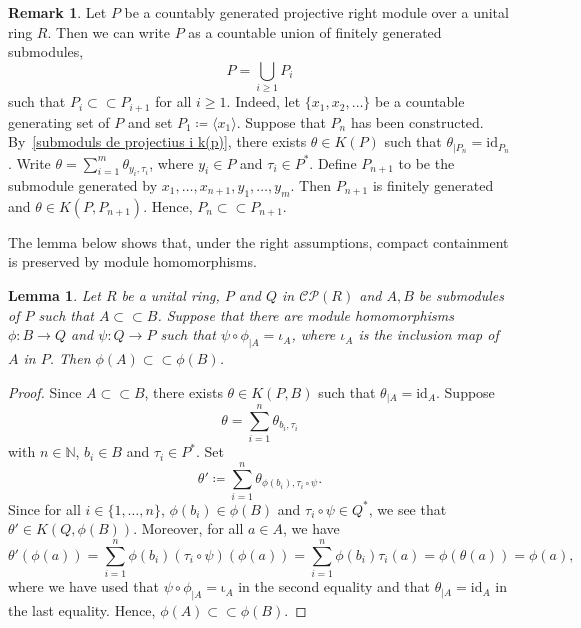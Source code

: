 \documentclass[11pt]{amsart}
\numberwithin{equation}{section}
\newtheorem{lma}{Lemma}[section]
\theoremstyle{definition}
\newtheorem{rmk}[rmkCt]{Remark}
\newcommand{\cc}{\subset\!\subset}
\theoremstyle{plain}
\theoremstyle{definition}
\begin{document}
\begin{rmk} \label{torre d'un projectiu en f.g. compactament continguts}
Let $P$ be a countably generated projective right module over a unital ring $R$. Then we can write $P$ as a countable union of finitely generated submodules, $$P = \bigcup_{i \geq 1} P_i$$ such that $P_i \subset\!\subset P_{i+1}$ for all $i \geq 1$. Indeed, let $\{ x_1, x_2, \dots\}$ be a countable generating set of $P$ and set $P_1 \coloneqq \langle x_1 \rangle$. Suppose that $P_n$ has been constructed. By~\autoref{submoduls de projectius i k(p)}, there exists $\theta \in K(P)$ such that $\theta_{|P_n} = \mathrm{id}_{P_n}$. Write $\theta = \sum_{i = 1}^m \theta_{y_i, \tau_i}$, where $y_i \in P$ and $\tau_i \in P^*$. Define $P_{n+1}$ to be the submodule generated by $x_1, \dots, x_{n+1}, y_1, \dots, y_m$. Then $P_{n+1}$ is finitely generated and $\theta \in K(P, P_{n+1})$. Hence, $P_n \cc P_{n+1}$.
\end{rmk}

The lemma below shows that, under the right assumptions, compact containment is preserved by module homomorphisms.

\begin{lma} \label{lema ucircphi CC ucircphi}
Let $R$ be a unital ring, $P$ and $Q$ in $\mathcal{CP}(R)$ and $A, B$ be submodules of $P$ such that $A \subset\!\subset B$. Suppose that there are module homomorphisms $\phi\colon B \rightarrow Q$ and $\psi\colon Q \rightarrow P$ such that $\psi \circ \phi_{|A} = \iota_A$, where $\iota_A$ is the inclusion map of $A$ in $P$.  Then $\phi(A) \subset\!\subset \phi(B)$. 
\end{lma}

\begin{proof}
Since $A \subset\!\subset B$, there exists $\theta \in K(P,B)$ such that $\theta_{|A} = \mathrm{id}_{A}$. Suppose 
\begin{equation*}
    \theta = \sum_{i=1}^n \theta_{b_i, \tau_i}
\end{equation*}
with $n \in \mathbb{N}$, $b_i \in B$ and $\tau_i \in P^*$. Set 
\begin{equation*}
    \theta' \coloneqq \sum_{i=1}^n \theta_{\phi (b_i), \tau_i \circ \psi}. 
\end{equation*}
Since for all $i \in \{1, \dots, n\}$, $\phi(b_i) \in \phi(B)$ and $\tau_i \circ \psi \in Q^*$, we see that $\theta' \in K(Q,\phi(B))$. Moreover, for all $a \in A$, we have 
\begin{equation*}
\theta'(\phi(a)) = \sum_{i=1}^n \phi(b_i)(\tau_i \circ \psi)(\phi(a)) = \sum_{i=1}^n \phi(b_i) \tau_i (a) = \phi(\theta(a)) = \phi(a), 
\end{equation*}
where we have used that $\psi \circ \phi_{|A} = \mathrm{\iota}_A$ in the second equality and that $\theta_{|A} = \mathrm{id}_{A}$ in the last equality. Hence, $\phi(A) \subset\!\subset \phi(B)$. 
\end{proof}
\end{document}
